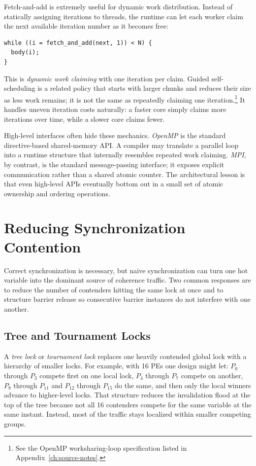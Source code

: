 Fetch-and-add is extremely useful for dynamic work distribution.
Instead of statically assigning iterations to threads, the runtime can let each worker claim the next available iteration number as it becomes free:
\begin{verbatim}
while ((i = fetch_and_add(next, 1)) < N) {
  body(i);
}
\end{verbatim}
This is \textit{dynamic work claiming} with one iteration per claim.
Guided self-scheduling is a related policy that starts with larger chunks and reduces their size as less work remains; it is not the same as repeatedly claiming one iteration.\footnote{See the OpenMP worksharing-loop specification listed in Appendix~\ref{ch:source-notes}.}
It handles uneven iteration costs naturally: a faster core simply claims more iterations over time, while a slower core claims fewer.

High-level interfaces often hide these mechanics.
\textit{OpenMP} is the standard directive-based shared-memory API\@.
A compiler may translate a parallel loop into a runtime structure that internally resembles repeated work claiming.
\textit{MPI}, by contrast, is the standard message-passing interface; it exposes explicit communication rather than a shared atomic counter.
The architectural lesson is that even high-level APIs eventually bottom out in a small set of atomic ownership and ordering operations.


\section{Reducing Synchronization Contention}\label{sec:sync-contention}
Correct synchronization is necessary, but naive synchronization can turn one hot variable into the dominant source of coherence traffic.
Two common responses are to reduce the number of contenders hitting the same lock at once and to structure barrier release so consecutive barrier instances do not interfere with one another.

\subsection*{Tree and Tournament Locks}
A \textit{tree lock} or \textit{tournament lock} replaces one heavily contended global lock with a hierarchy of smaller locks.
For example, with 16 PEs one design might let:
$P_0$ through $P_3$ compete first on one local lock, $P_4$ through $P_7$ compete on another, $P_8$ through $P_{11}$ and $P_{12}$ through $P_{15}$ do the same, and then only the local winners advance to higher-level locks.
That structure reduces the invalidation flood at the top of the tree because not all 16 contenders compete for the same variable at the same instant.
Instead, most of the traffic stays localized within smaller competing groups.

